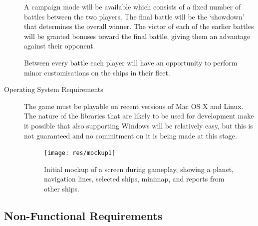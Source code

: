 \begin{description}
	A campaign mode will be available which consists of a fixed number of battles between the two players.
	The final battle will be the `showdown' that determines the overall winner. The victor of each of
	the earlier battles will be granted bonuses toward the final battle, giving them an advantage against
	their opponent.

	Between every battle each player will have an opportunity to perform minor customisations on
	the ships in their fleet.

	\item[Operating System Requirements]

	The game must be playable on recent versions of Mac OS X and Linux. The nature of the libraries that are likely to be used for development make it possible that also supporting Windows will be relatively easy, but this is not guaranteed and no commitment on it is being made at this stage.


\begin{figure}
	\texttt{[image: res/mockup1]}
	\caption{Initial mockup of a screen during gameplay, showing a planet, navigation lines, selected ships, minimap, and reports from other ships.}
	\label{fig:mockup1}
\end{figure}

\end{description}

\subsection{Non-Functional Requirements}

